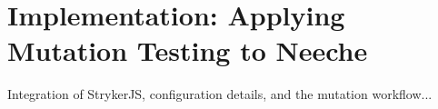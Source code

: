 \chapter{Implementation: Applying Mutation Testing to Neeche}
\label{chap:implementation}

Integration of StrykerJS, configuration details, and the mutation workflow...
